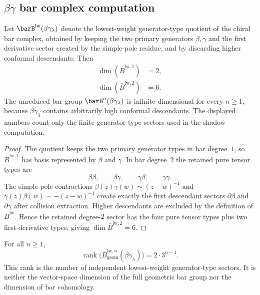 \subsection{\texorpdfstring{$\beta\gamma$}{beta-gamma} bar complex computation}

\begin{theorem}\label{thm:betagamma-bar-complex}
Let $\barB^{\mathrm{lw}}(\beta\gamma_\lambda)$ denote the
lowest-weight generator-type quotient of the chiral bar complex,
obtained by keeping the two primary generators
$\beta,\gamma$ and the first derivative sector created by the
simple-pole residue, and by discarding higher conformal descendants.
Then
\begin{align}
\dim(\bar{B}^{\mathrm{lw},1}) &= 2, \\
\dim(\bar{B}^{\mathrm{lw},2}) &= 6.
\end{align}
The unreduced bar group $\barB^n(\beta\gamma_\lambda)$ is
infinite-dimensional for every $n\geq 1$, because
$\overline{\beta\gamma_\lambda}$ contains arbitrarily high
conformal descendants. The displayed numbers count only the
finite generator-type sectors used in the shadow computation.
\end{theorem}

\begin{proof}
The quotient keeps the two primary generator types in bar degree~$1$,
so $\bar B^{\mathrm{lw},1}$ has basis represented by
$\beta$ and $\gamma$. In bar degree~$2$ the retained pure tensor
types are
\[
\beta\beta,\qquad \beta\gamma,\qquad
\gamma\beta,\qquad \gamma\gamma.
\]
The simple-pole contractions
$\beta(z)\gamma(w)\sim (z-w)^{-1}$ and
$\gamma(z)\beta(w)\sim -(z-w)^{-1}$ create exactly the first
descendant sectors $\partial\beta$ and $\partial\gamma$ after
collision extraction. Higher descendants are excluded by the
definition of $\bar B^{\mathrm{lw}}$. Hence the retained degree-$2$
sector has the four pure tensor types plus two first-derivative
types, giving $\dim \bar B^{\mathrm{lw},2}=6$.
\end{proof}

\begin{theorem}\label{thm:betagamma-bar-dim}
For all $n \geq 1$,
\[
\operatorname{rank}\bigl(\bar{B}^{\mathrm{lw},n}_{\mathrm{geom}}
(\beta\gamma_\lambda)\bigr)=2\cdot 3^{n-1}.
\]
This rank is the number of independent lowest-weight generator-type
sectors. It is neither the vector-space dimension of the full
geometric bar group nor the dimension of bar cohomology.
\end{theorem}

